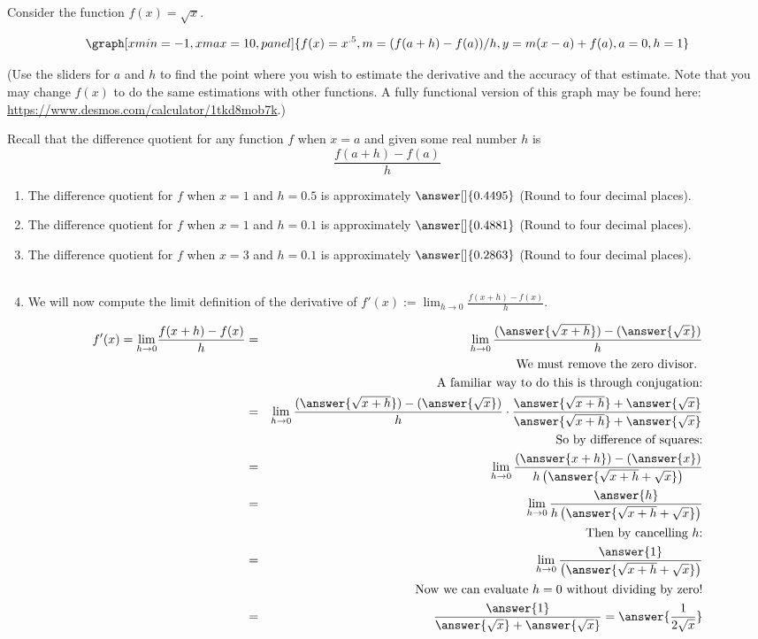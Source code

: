\documentclass{ximera}
\begin{document}
\begin{question}
Consider the function $f(x)=\sqrt{x}$.  

\begin{onlineOnly}
$$\graph[xmin=-1,xmax=10, panel]{f(x)=x^{.5},m=(f(a+h)-f(a))/h,  y=m(x-a)+f(a), a=0, h=1}$$
\end{onlineOnly}
(Use the sliders for $a$ and $h$ to find the point where you wish to estimate the derivative and the accuracy of that estimate.  Note that you may change $f(x)$ to do the same estimations with other functions.  A fully functional version of this graph may be found here: \url{https://www.desmos.com/calculator/1tkd8mob7k}.)

Recall that the difference quotient for any function $f$ when $x=a$ and given some real number $h$ is $$\frac{f(a+h)-f(a)}{h}$$

\begin{enumerate}
\item The difference quotient for $f$ when $x=1$ and $h=0.5$ is approximately $\answer[ ]{0.4495}$ (Round to four decimal places). 
\item The difference quotient for $f$ when $x=1$ and $h=0.1$ is approximately $\answer[ ]{0.4881}$ (Round to four decimal places).  
\item The difference quotient for $f$ when $x=3$ and $h=0.1$ is approximately $\answer[ ]{0.2863}$ (Round to four decimal places).\\ \\
\item We will now compute the limit definition of the derivative of $ f'(x):={\displaystyle \lim_{h\to 0}} \frac{f(x+h)-f(x)}{h}$.

\begin{eqnarray*}
f'(x)={\displaystyle \lim_{h\to 0}} \frac{f(x+h)-f(x)}{h}&=& \displaystyle \lim_{h\to 0}\frac{(\answer{\sqrt{x+h}})-(\answer{\sqrt{x}})}{h}\\
&&\text{We must remove the zero divisor. }\\ && \text{A familiar way to do this is through conjugation:}\\
&=& \displaystyle \lim_{h\to 0}\frac{(\answer{\sqrt{x+h}})-(\answer{\sqrt{x}})}{h}\cdot \frac{\answer{\sqrt{x+h}}+\answer{\sqrt{x}}}{\answer{\sqrt{x+h}}+\answer{\sqrt{x}}}\\
&&\text{So by difference of squares:}\\
&=& \displaystyle \lim_{h\to 0}\frac{(\answer{x+h})-(\answer{x})}{h\left(\answer{\sqrt{x+h}+\sqrt{x}}\right)}\\
&=& \displaystyle \lim_{h\to 0}\frac{\answer{h}}{h\left(\answer{\sqrt{x+h}+\sqrt{x}}\right)}\\
&&\text{Then by cancelling $h$:}\\
&=& \displaystyle \lim_{h\to 0}\frac{\answer{1}}{\left(\answer{\sqrt{x+h}+\sqrt{x}}\right)}\\
&&\text{Now we can evaluate $h=0$ without dividing by zero!}\\
&=&\frac{\answer{1}}{\answer{\sqrt{x}}+\answer{\sqrt{x}}}= \answer{\frac{1}{2\sqrt{x}}}
\end{eqnarray*}



\end{enumerate}
\end{question}
\end{document}
